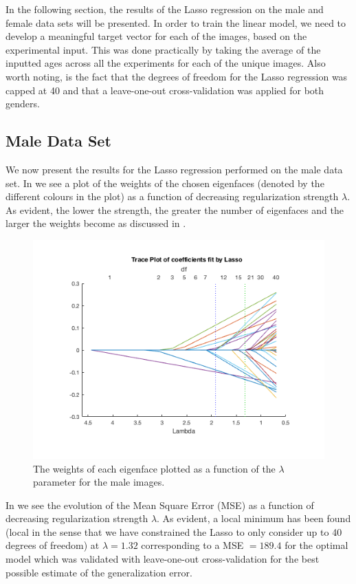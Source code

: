 
In the following section, the results of the Lasso regression on the male and female data sets will be presented. In order to train the linear model, we need to develop a meaningful target vector for each of the images, based on the experimental input. This was done practically by taking the average of the inputted ages across all the experiments for each of the unique images. Also worth noting, is the fact that the degrees of freedom for the Lasso regression was capped at 40 and that a leave-one-out cross-validation was applied for both genders.

\subsection{Male Data Set}
We now present the results for the Lasso regression performed on the male data set. In  we see a plot of the weights of the chosen eigenfaces (denoted by the different colours in the plot) as a function of decreasing regularization strength $\lambda$. As evident, the lower the strength, the greater the number of eigenfaces and the larger the weights become as discussed in .

\begin{figure}[ht!]
    \centering
    \includegraphics[width=0.85\linewidth]{fig/Trace_M_40.png}
    \caption{The weights of each eigenface plotted as a function of the $\lambda$ parameter for the male images.}
    \label{fig:M_Trace}
\end{figure}

In  we see the evolution of the Mean Square Error (MSE) as a function of decreasing regularization strength $\lambda$. As evident, a local minimum has been found (local in the sense that we have constrained the Lasso to only consider up to 40 degrees of freedom) at $\lambda = 1.32$ corresponding to a MSE $= 189.4$ for the optimal model which was validated with leave-one-out cross-validation for the best possible estimate of the generalization error. 


